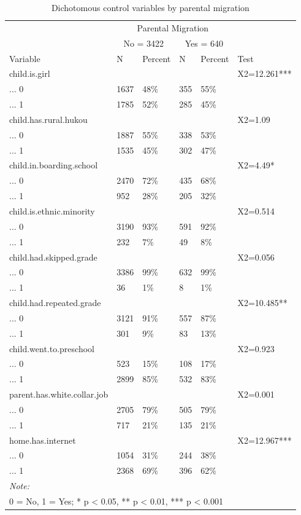 \documentclass[
  man,floatsintext]{apa7}
\begin{document}
\begin{table}

\caption{\label{tab:tab-ctvar-dit}Dichotomous control variables by parental migration}
\centering
\begin{tabular}[t]{llllll}
\toprule
\multicolumn{1}{c}{ } & \multicolumn{4}{c}{Parental Migration} \\
\cmidrule(l{3pt}r{3pt}){2-5}
\multicolumn{1}{c}{ } & \multicolumn{2}{c}{No = 3422} & \multicolumn{2}{c}{Yes = 640} \\
\cmidrule(l{3pt}r{3pt}){2-3} \cmidrule(l{3pt}r{3pt}){4-5}
Variable & N & Percent & N & Percent & Test\\
\midrule
child.is.girl &  &  &  &  & X2=12.261***\\
... 0 & 1637 & 48\% & 355 & 55\% & \\
... 1 & 1785 & 52\% & 285 & 45\% & \\
child.has.rural.hukou &  &  &  &  & X2=1.09\\
... 0 & 1887 & 55\% & 338 & 53\% & \\
\addlinespace
... 1 & 1535 & 45\% & 302 & 47\% & \\
child.in.boarding.school &  &  &  &  & X2=4.49*\\
... 0 & 2470 & 72\% & 435 & 68\% & \\
... 1 & 952 & 28\% & 205 & 32\% & \\
child.is.ethnic.minority &  &  &  &  & X2=0.514\\
\addlinespace
... 0 & 3190 & 93\% & 591 & 92\% & \\
... 1 & 232 & 7\% & 49 & 8\% & \\
child.had.skipped.grade &  &  &  &  & X2=0.056\\
... 0 & 3386 & 99\% & 632 & 99\% & \\
... 1 & 36 & 1\% & 8 & 1\% & \\
\addlinespace
child.had.repeated.grade &  &  &  &  & X2=10.485**\\
... 0 & 3121 & 91\% & 557 & 87\% & \\
... 1 & 301 & 9\% & 83 & 13\% & \\
child.went.to.preschool &  &  &  &  & X2=0.923\\
... 0 & 523 & 15\% & 108 & 17\% & \\
\addlinespace
... 1 & 2899 & 85\% & 532 & 83\% & \\
parent.has.white.collar.job &  &  &  &  & X2=0.001\\
... 0 & 2705 & 79\% & 505 & 79\% & \\
... 1 & 717 & 21\% & 135 & 21\% & \\
home.has.internet &  &  &  &  & X2=12.967***\\
\addlinespace
... 0 & 1054 & 31\% & 244 & 38\% & \\
... 1 & 2368 & 69\% & 396 & 62\% & \\
\bottomrule
\multicolumn{6}{l}{\rule{0pt}{1em}\textit{Note: }}\\
\multicolumn{6}{l}{\rule{0pt}{1em}0 = No, 1 = Yes; * p < 0.05, ** p < 0.01, *** p < 0.001}\\
\end{tabular}
\end{table}
\end{document}
